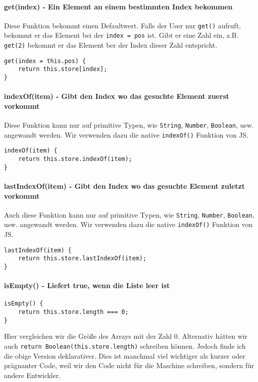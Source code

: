 \documentclass[babel]{book}
\begin{document}
\paragraph{get(index) - Ein Element an einem bestimmten Index bekommen}
Diese Funktion bekommt einen Defaultwert. Falls der User nur \lstinline|get()| aufruft, bekommt er das Element bei der \lstinline|index = pos| ist. Gibt er eine Zahl ein, z.B. \lstinline|get(2)| bekommt er das Element ber der Index dieser Zahl entspricht.
\begin{lstlisting}[caption=Array Konstruktor]
get(index = this.pos) {
	return this.store[index];
}
\end{lstlisting}

\paragraph{indexOf(item) - Gibt den Index wo das gesuchte Element zuerst vorkommt} Diese Funktion kann nur auf primitive Typen, wie \lstinline|String|, \lstinline|Number|, \lstinline|Boolean|, usw. angewandt werden. Wir verwenden dazu die native \lstinline|indexOf()| Funktion von JS.
\begin{lstlisting}[caption=Array Konstruktor]
indexOf(item) {
	return this.store.indexOf(item);
}
\end{lstlisting}

\paragraph{lastIndexOf(item) - Gibt den Index wo das gesuchte Element zuletzt vorkommt} Auch diese Funktion kann nur auf primitive Typen, wie \lstinline|String|, \lstinline|Number|, \lstinline|Boolean|, usw. angewandt werden. Wir verwenden dazu die native \mbox{\lstinline|indexOf()|} Funktion von JS.
\begin{lstlisting}[caption=Array Konstruktor]
lastIndexOf(item) {
	return this.store.lastIndexOf(item);
}
\end{lstlisting}

\paragraph{isEmpty() - Liefert true, wenn die Liste leer ist} 
\begin{lstlisting}[caption=Array Konstruktor]
isEmpty() {
	return this.store.length === 0;
}
\end{lstlisting}
Hier vergleichen wir die Größe des Arrays mit der Zahl 0. Alternativ hätten wir auch \lstinline|return Boolean(this.store.length)| schreiben können. Jedoch finde ich die obige Version deklarativer. Dies ist manchmal viel wichtiger als kurzer oder prägnanter Code, weil wir den Code nicht für die Maschine schreiben, sondern für andere Entwickler.
\end{document}
